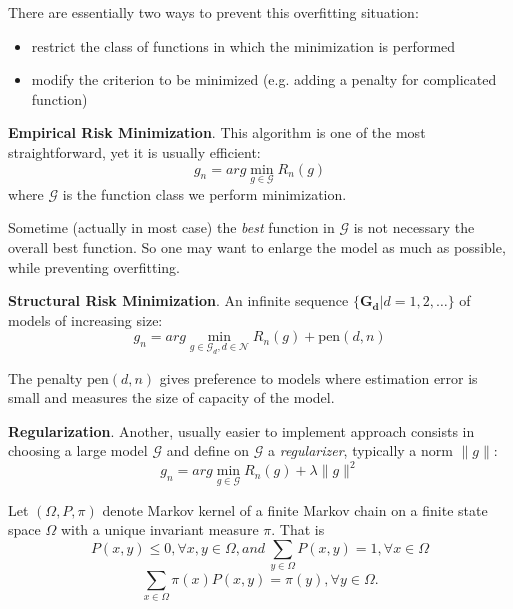 \documentclass[12pt,reqno]{amsart}
\begin{document}
There are essentially two ways to prevent this overfitting situation:
\begin{itemize}
\item restrict the class of functions in which the minimization is performed 
\item modify the criterion to be minimized (e.g. adding a penalty for complicated function)
\end{itemize}

\textbf{Empirical Risk Minimization}. This algorithm is one of the most straightforward, yet it is usually efficient:
\begin{equation}
	g_n = arg \min_{g\in \mathcal{G}} R_n(g)
\end{equation}
where $\mathcal{G}$ is the function class we perform minimization.

Sometime (actually in most case) the \textit{best} function in $\mathcal{G}$ is not necessary the overall best function. So one may want to enlarge the model as much as possible, while preventing overfitting.

\textbf{Structural Risk Minimization}.
An infinite sequence $\{\mathbf{G_d} | d=1, 2, \ldots \}$ of models of increasing size:
\begin{equation}
	g_n = arg \min_{g\in \mathcal{G}_d, d\in\mathcal{N}} R_n(g) + \text{pen}(d,n)
\end{equation}

The penalty $\text{pen}(d,n)$ gives preference to models where estimation error is small and measures the size of capacity of the model.



\textbf{Regularization}. Another, usually easier to implement approach consists in choosing a large model $\mathcal{G}$ and define on $\mathcal{G}$ a \textit{regularizer}, typically a norm $\|g\|$:
\begin{equation}
	g_n = arg \min_{g\in \mathcal{G}} R_n(g) + \lambda \|g\|^2
\end{equation}









Let $(\Omega,P,\pi)$ denote Markov kernel of a finite Markov chain on a finite state
space $\Omega$ with a unique invariant measure $\pi$. That is 
\[ P(x,y)\leq 0, \forall x,y \in \Omega, and~ \sum_{y\in \Omega}P(x,y)=1, \forall x\in \Omega
\] 
\[
\sum_{x\in \Omega}\pi (x)P(x,y) = \pi(y), \forall y \in \Omega.
\]
\end{document}
